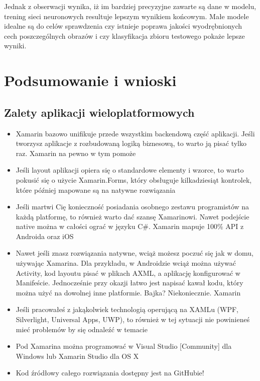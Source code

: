 \documentclass[brudnopis]{xmgr}
\begin{document}
Jednak z obserwacji wynika, iż im bardziej precyzyjne zawarte są dane w modelu, trening sieci neuronowych resultuje lepszym wynikiem końcowym. Małe modele idealne są do celów sprawdzenia czy istnieje poprawa jakości wyodrębnionych cech poszczególnych obrazów i czy klasyfikacja zbioru testowego pokaże lepsze wyniki.

\chapter{Podsumowanie i wnioski}

\section{Zalety aplikacji wieloplatformowych}

\begin{itemize}
\item
Xamarin bazowo unifikuje przede wszystkim backendową część aplikacji. Jeśli tworzysz aplikacje z rozbudowaną logiką biznesową, to warto ją pisać tylko raz. Xamarin na pewno w tym pomoże
\item
Jeśli layout aplikacji opiera się o standardowe elementy i wzorce, to warto pokusić się o użycie Xamarin.Forms, który obsługuje kilkadziesiąt kontrolek, które później mapowane są na natywne rozwiązania
\item
Jeśli martwi Cię konieczność posiadania osobnego zestawu programistów na każdą platformę, to również warto dać szansę Xamarinowi. Nawet podejście native można w całości ograć w języku C\#. Xamarin mapuje 100\% API z Androida oraz iOS
\item
Nawet jeśli znasz rozwiązania natywne, wciąż możesz poczuć się jak w domu, używając Xamarina. Dla przykładu, w Androidzie wciąż można używać Activity, kod layoutu pisać w plikach AXML, a aplikację konfigurować w Manifeście. Jednocześnie przy okazji łatwo jest napisać kawał kodu, który można użyć na dowolnej inne platformie. Bajka? Niekoniecznie. Xamarin
\item
Jeśli pracowałeś z jakąkolwiek technologią operującą na XAMLu (WPF, Silverlight, Universal Apps, UWP), to również w tej sytuacji nie powinieneś mieć problemów by się odnaleźć w temacie
\item
Pod Xamarina można programować w Visual Studio [Community] dla Windows lub Xamarin Studio dla OS X
\item
Kod źródłowy całego rozwiązania dostępny jest na GitHubie!
\end{itemize}
\end{document}

